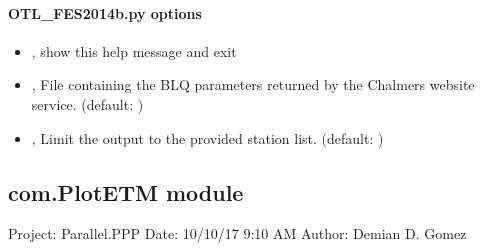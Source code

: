 \documentclass[letterpaper,10pt,english]{sphinxmanual}
\begin{document}
\paragraph{OTL\_FES2014b.py options}
\label{\detokenize{com:OTL_FES2014b.py-options}}\begin{itemize}
\item {} 
\sphinxAtStartPar
{\hyperref[\detokenize{com:OTL_FES2014b.py--h}]{}}, {\hyperref[\detokenize{com:OTL_FES2014b.py---help}]{}} \sphinxhyphen{} show this help message and exit

\item {} 
\sphinxAtStartPar
{\hyperref[\detokenize{com:OTL_FES2014b.py--import}]{}} , {\hyperref[\detokenize{com:OTL_FES2014b.py---import_otl}]{}}  \sphinxhyphen{} File containing the BLQ parameters returned by the Chalmers website service. (default: )

\item {} 
\sphinxAtStartPar
{\hyperref[\detokenize{com:OTL_FES2014b.py--stn}]{}} , {\hyperref[\detokenize{com:OTL_FES2014b.py---station_list}]{}}  \sphinxhyphen{} Limit the output to the provided station list. (default: )

\end{itemize}


\subsection{com.PlotETM module}
\label{\detokenize{com:module-com.PlotETM}}\label{\detokenize{com:com-plotetm-module}}
\sphinxAtStartPar
Project: Parallel.PPP
Date: 10/10/17 9:10 AM
Author: Demian D. Gomez
\end{document}
